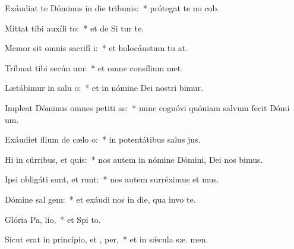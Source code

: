 \item Exáudiat te Dóminus in die tribunis:~* prótegat te no  cob.
\item Mittat tibi auxíli  to:~* et de Si tur te.
\item Memor sit omnis sacrifí i:~* et holocáustum tu  at.
\item Tríbuat tibi secún  um:~* et omne consílium  met.
\item Lætábimur in salu o:~* et in nómine Dei nostri bimur.
\item Impleat Dóminus omnes petiti as:~* nunc cognóvi quóniam salvum fecit Dómi  um.
\item Exáudiet illum de cælo  o:~* in potentátibus salus  jus.
\item Hi in cúrribus, et   quis:~* nos autem in nómine Dómini, Dei nos bimus.
\item Ipsi obligáti sunt, et runt:~* nos autem surréximus et  mus.
\item Dómine sal  gem:~* et exáudi nos in die, qua invo te.
\item Glória Pa,  lio,~* et Spi to.
\item Sicut erat in princípio, et ,  per,~* et in sǽcula sæ. men.
